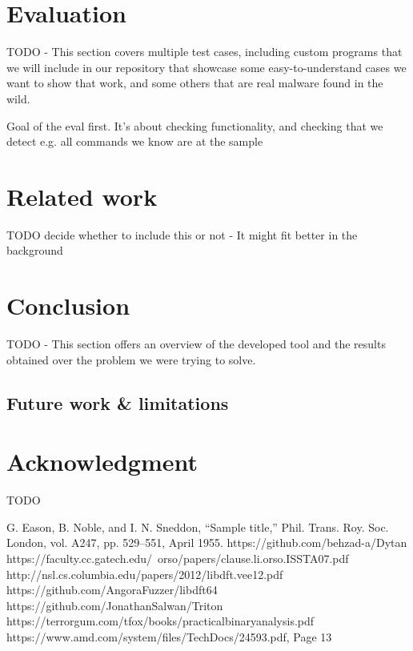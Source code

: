 \documentclass[conference]{IEEEtran}
\begin{document}

\section{Evaluation}
TODO - This section covers multiple test cases, including custom programs that
we will include in our repository that showcase some easy-to-understand cases
we want to show that work, and some others that are real malware found in the
wild.

Goal of the eval first. It's about checking functionality, and checking that we
detect e.g. all commands we know are at the sample

\section{Related work}
TODO decide whether to include this or not - It might fit better in the
background

\section{Conclusion}
TODO - This section offers an overview of the developed tool and the results
obtained over the problem we were trying to solve.

\subsection{Future work \& limitations}

\section*{Acknowledgment}
TODO

\begin{thebibliography}{00}
     G. Eason, B. Noble, and I. N. Sneddon, ``Sample title,'' Phil. Trans. Roy. Soc. London, vol. A247, pp. 529--551, April 1955.
     https://github.com/behzad-a/Dytan
     https://faculty.cc.gatech.edu/~orso/papers/clause.li.orso.ISSTA07.pdf
     http://nsl.cs.columbia.edu/papers/2012/libdft.vee12.pdf
     https://github.com/AngoraFuzzer/libdft64
     https://github.com/JonathanSalwan/Triton
     https://terrorgum.com/tfox/books/practicalbinaryanalysis.pdf
     https://www.amd.com/system/files/TechDocs/24593.pdf, Page 13

\end{thebibliography}
\vspace{12pt}
\end{document}
